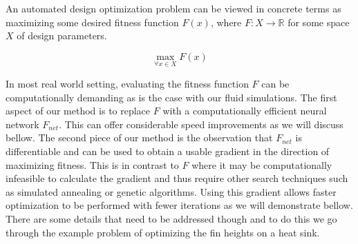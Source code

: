 \documentclass{article} %
\begin{document}
An automated design optimization problem can be viewed in concrete terms as maximizing some desired fitness function $F(x)$, where $F:X \rightarrow \mathbb{R}$ for some space $X$ of design parameters.

\begin{equation}
  \max_{\forall x \in X} F(x)
\end{equation}

In most real world setting, evaluating the fitness function $F$ can be computationally demanding as is the case with our fluid simulations. The first aspect of our method is to replace $F$ with a computationally efficient neural network $F_{net}$. This can offer considerable speed improvements as we will discuss bellow. The second piece of our method is the observation that $F_{net}$ is differentiable and can be used to obtain a usable gradient in the direction of maximizing fitness. This is in contrast to $F$ where it may be computationally infeasible to calculate the gradient and thus require other search techniques such as simulated annealing or genetic algorithms. Using this gradient allows faster optimization to be performed with fewer iterations as we will demonstrate bellow. There are some details that need to be addressed though and to do this we go through the example problem of optimizing the fin heights on a heat sink.
\end{document}
